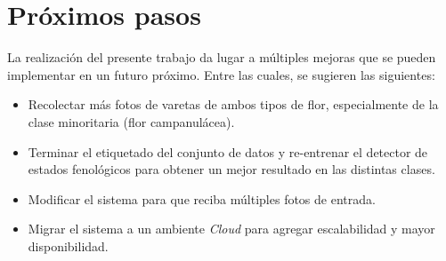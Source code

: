 \section{Próximos pasos}

La realización del presente trabajo da lugar a múltiples mejoras que se pueden implementar en un futuro próximo. Entre las cuales, se sugieren las siguientes:

\begin{itemize}
\item Recolectar más fotos de varetas de ambos tipos de flor, especialmente de la clase minoritaria (flor campanulácea).
\item Terminar el etiquetado del conjunto de datos y re-entrenar el detector de estados fenológicos para obtener un mejor resultado en las distintas clases.
\item Modificar el sistema para que reciba múltiples fotos de entrada.
\item Migrar el sistema a un ambiente \textit{Cloud} para agregar escalabilidad y mayor disponibilidad.
\end{itemize}
